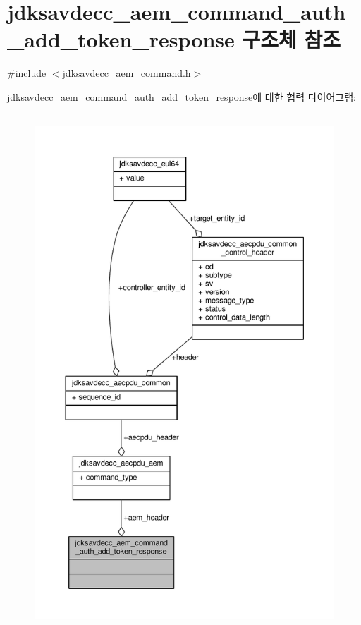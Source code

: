 \hypertarget{structjdksavdecc__aem__command__auth__add__token__response}{}\section{jdksavdecc\+\_\+aem\+\_\+command\+\_\+auth\+\_\+add\+\_\+token\+\_\+response 구조체 참조}
\label{structjdksavdecc__aem__command__auth__add__token__response}


{\ttfamily \#include $<$jdksavdecc\+\_\+aem\+\_\+command.\+h$>$}



jdksavdecc\+\_\+aem\+\_\+command\+\_\+auth\+\_\+add\+\_\+token\+\_\+response에 대한 협력 다이어그램\+:
\nopagebreak
\begin{figure}[H]
\begin{center}
\leavevmode
\includegraphics[height=550pt]{structjdksavdecc__aem__command__auth__add__token__response__coll__graph}
\end{center}
\end{figure}

